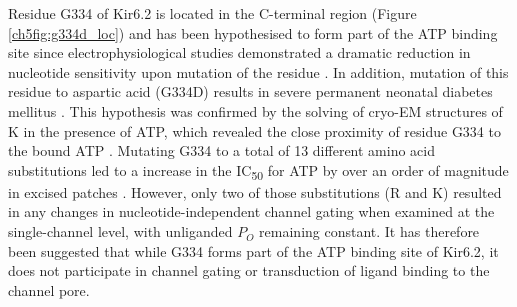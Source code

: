 Residue G334 of Kir6.2 is located in the C-terminal region (Figure \ref{ch5fig:g334d_loc}) and has been hypothesised to form part of the ATP binding site since electrophysiological studies demonstrated a dramatic reduction in nucleotide sensitivity upon mutation of the residue \cite{drain_katp_1998, li_open_2002, li_ligand-dependent_2005}.
In addition, mutation of this residue to aspartic acid (G334D) results in severe permanent neonatal diabetes mellitus \cite{masia_atp-binding_2007-1}.
This hypothesis was confirmed by the solving of cryo-EM structures of K\ATP{} in the presence of ATP, which revealed the close proximity of residue G334 to the bound ATP \cite{lee_molecular_2017, martin_anti-diabetic_2017, li_structure_2017, puljung_cryo-electron_2018-1}.
Mutating G334 to a total of 13 different amino acid substitutions led to a increase in the IC\textsubscript{50} for ATP by over an order of magnitude in excised patches \cite{li_ligand-dependent_2005}.
However, only two of those substitutions (R and K) resulted in any changes in nucleotide-independent channel gating when examined at the single-channel level, with unliganded $P_O$ remaining constant.
It has therefore been suggested that while G334 forms part of the ATP binding site of Kir6.2, it does not participate in channel gating or transduction of ligand binding to the channel pore.

